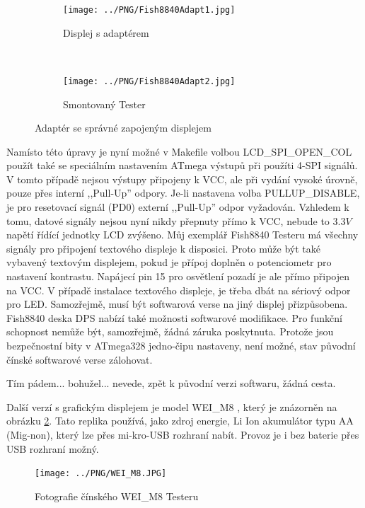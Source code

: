 \begin{figure}[H]
  \begin{subfigure}[b]{.5\textwidth}
    \centering
    \texttt{[image: ../PNG/Fish8840Adapt1.jpg]}
    \caption{Displej s adaptérem}
  \end{subfigure}
  ~
  \begin{subfigure}[b]{.5\textwidth}
    \centering
    \texttt{[image: ../PNG/Fish8840Adapt2.jpg]}
    \caption{Smontovaný Tester}
  \end{subfigure}
  \caption{Adaptér se správné zapojeným displejem}
  \label{fig:Fish8840Adapt}
\end{figure}

Namísto této úpravy je nyní možné v Makefile volbou LCD\_SPI\_OPEN\_COL použít také se speciálním nastavením
ATmega výstupů při použíti 4-SPI signálů.
V tomto případě nejsou výstupy připojeny k VCC, ale při vydání vysoké úrovně, pouze přes
interní ,,Pull-Up'' odpory.
Je-li nastavena volba PULLUP\_DISABLE, je pro resetovací signál (PD0) externí ,,Pull-Up'' odpor vyžadován.
Vzhledem k tomu, datové signály nejsou nyní nikdy přepnuty přímo k VCC, nebude to  \(3.3V\)
napětí řídící jednotky LCD zvýšeno.
Můj exemplář Fish8840 Testeru má všechny signály pro připojení textového displeje k disposici. 
Proto může být také vybavený textovým displejem, pokud je přípoj doplněn o potenciometr pro nastavení kontrastu.
Napájecí pin 15 pro osvětlení pozadí je ale přímo připojen na VCC.
V případě instalace textového displeje, je třeba dbát na sériový odpor pro LED.
Samozřejmě, musí být softwarová verse na jiný displej přizpůsobena.
Fish8840 deska DPS nabízí také možnosti softwarové modifikace.
Pro funkční schopnost nemůže být, samozřejmě, žádná záruka poskytnuta.
Protože jsou bezpečnostní bity v ATmega328 jedno-čipu nastaveny, není možné,
stav původní čínské softwarové verse zálohovat.

Tím pádem... bohužel... nevede, zpět k původní verzi softwaru, žádná cesta.


Další verzí s grafickým displejem je model WEI\_M8 , který je znázorněn na obrázku \ref{fig:WeiM8}.
Tato replika používá, jako zdroj energie, Li Ion akumulátor typu AA (Mig-non), který lze přes
mi-kro-USB rozhraní nabít. Provoz je i bez baterie přes USB rozhraní možný.

\begin{figure}[H]
\centering
\texttt{[image: ../PNG/WEI\_M8.JPG]}
\caption{Fotografie čínského WEI\_M8 Testeru}
\label{fig:WeiM8}
\end{figure}

